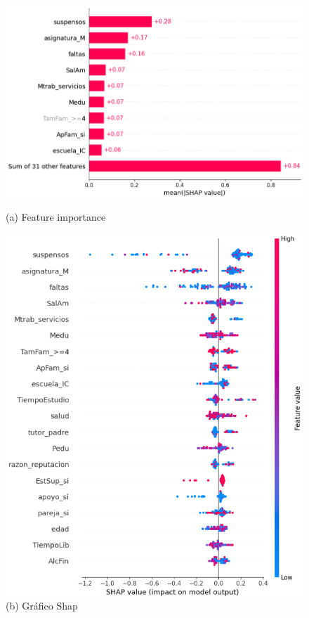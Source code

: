 \documentclass{article}
\begin{document}
\begin{figure}[h!]
  \centering
  \begin{minipage}[b]{0.45\textwidth}
      \centering
      \includegraphics[scale=0.35]{Shap1_M2.png}
      \caption{(a) Feature importance}
  \end{minipage}
  \hfill
  \begin{minipage}[b]{0.45\textwidth}
      \centering
      \includegraphics[scale=0.27]{Shap2_M2.png}
      \caption{(b) Gráfico Shap}
  \end{minipage}
\end{figure}
\end{document}
